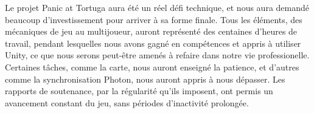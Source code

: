 \documentclass[french]{article}
\begin{document}
Le projet Panic at Tortuga aura été un réel défi technique, et nous aura demandé beaucoup d'investissement pour arriver à sa forme finale. Tous les éléments, 
des mécaniques de jeu au multijoueur, auront représenté des centaines d'heures de travail, pendant lesquelles nous avons gagné en compétences et appris à utiliser 
Unity, ce que nous serons peut-être amenés à refaire dans notre vie professionelle. Certaines tâches, comme la carte, nous auront enseigné la patience, et d'autres 
comme la synchronisation Photon, nous auront appris à nous dépasser. Les rapports de soutenance, par la régularité qu'ils imposent, ont permis un avancement 
constant du jeu, sans périodes d'inactivité prolongée. 


\listoffigures
\listoftables
\end{document}
